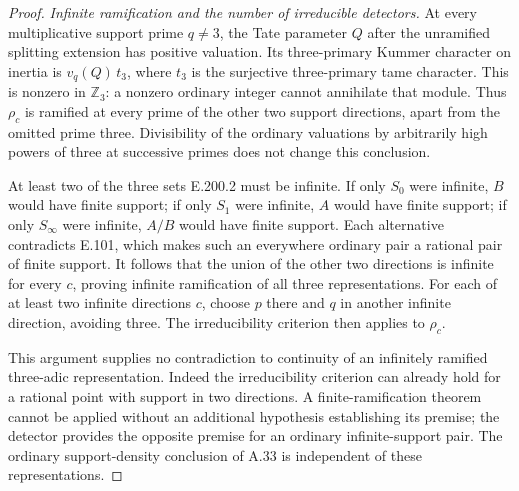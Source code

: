 \begin{proof}
\emph{Infinite ramification and the number of irreducible detectors.}
At every multiplicative support prime \(q\ne3\), the Tate
parameter \(Q\) after the unramified splitting extension has
positive valuation.  Its three-primary Kummer character on
inertia is
\(v_q(Q)\,t_3\), where \(t_3\) is the surjective three-primary
tame character.  This is nonzero in \(\mathbb Z_3\): a nonzero
ordinary integer cannot annihilate that module.  Thus \(\rho_c\)
is ramified at every prime of the other two support directions,
apart from the omitted prime three.  Divisibility of the
ordinary valuations by arbitrarily high powers of three at
successive primes does not change this conclusion.

At least two of the three sets E.200.2 must be infinite.  If only
\(S_0\) were infinite, \(B\) would have finite support; if only
\(S_1\) were infinite, \(A\) would have finite support; if only
\(S_\infty\) were infinite, \(A/B\) would have finite support.
Each alternative contradicts E.101, which makes such an
everywhere ordinary pair a rational pair of finite support.
It follows that the union of the other two directions is
infinite for every \(c\), proving infinite ramification of all
three representations.  For each of at least two infinite
directions \(c\), choose \(p\) there and \(q\) in another
infinite direction, avoiding three.  The irreducibility criterion
then applies to \(\rho_c\).

This argument supplies no contradiction to continuity of an
infinitely ramified three-adic representation.  Indeed the
irreducibility criterion can already hold for a rational point
with support in two directions.  A finite-ramification theorem
cannot be applied without an additional hypothesis establishing
its premise; the detector provides the opposite premise for
an ordinary infinite-support pair.  The ordinary support-density
conclusion of A.33 is independent of these representations.
\end{proof}
